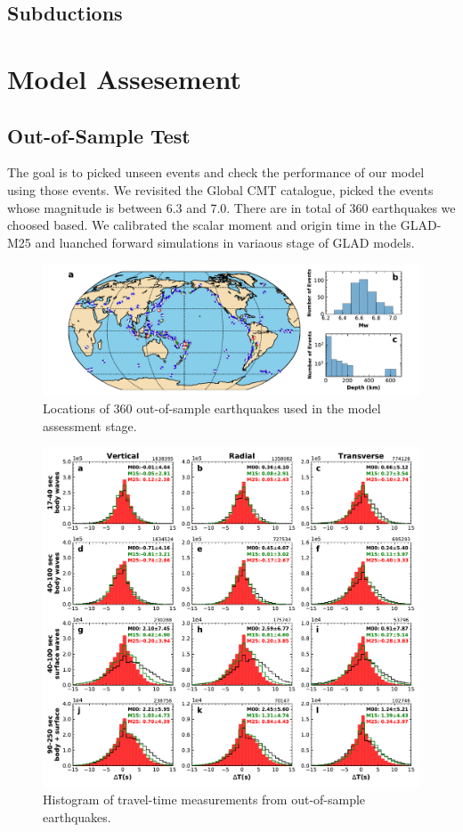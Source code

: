 \documentclass[extra,mreferee]{gji}
\begin{document}
\subsection{Subductions}

\section{Model Assesement}

\subsection{Out-of-Sample Test}

The goal is to picked unseen events and check the performance of our model using those events. We revisited the Global CMT catalogue, picked the events whose magnitude is between 6.3 and 7.0. There are in total of 360 earthquakes we choosed based. We calibrated the scalar moment and origin time in the GLAD-M25 and luanched forward simulations in variaous stage of GLAD models. 

\begin{figure}
\includegraphics[width=\textwidth]{figures/events_360.pdf}
\caption{Locations of 360 out-of-sample earthquakes used in the model assessment stage.}
\centering
\end{figure}

\begin{figure}
\includegraphics[width=\textwidth]{figures/dt_histogram_360.pdf}
\caption{Histogram of travel-time measurements from out-of-sample earthquakes.}
\centering
\end{figure}
\end{document}
